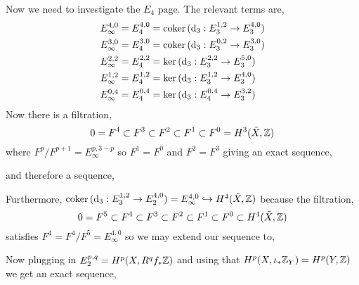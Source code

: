 \documentclass[12pt]{article}
\begin{document}
Now we need to investigate the $E_4$ page. The relevant terms are,
\begin{align*}
E^{4,0}_\infty & = E^{4,0}_4 = \operatorname{\mathrm{coker}}{(\mathrm{d}_3 : E^{1,2}_3 \to E^{4,0}_3)} 
\\
E^{3,0}_\infty & = E^{3,0}_4 = \operatorname{\mathrm{coker}}{(\mathrm{d}_3 : E^{0,2}_3 \to E^{3,0}_3)}
\\
E^{2,2}_{\infty} & = E^{2,2}_4 = \ker{(\mathrm{d}_3 : E^{2,2}_3 \to E^{5, 0}_3)}
\\
E^{1,2}_{\infty} & = E^{1,2}_4 = \ker{(\mathrm{d}_3 : E^{1,2}_3 \to E^{4, 0}_3)}
\\
E^{0,4}_{\infty} & = E^{0,4}_4 = \ker{(\mathrm{d}_3 : E^{0, 4}_4 \to E^{3, 2}_3)}
\end{align*}
Now there is a filtration,
\[ 0 = F^4 \subset F^3 \subset F^2 \subset F^1 \subset F^0 = H^3(\tilde{X}, \mathbb{Z}) \]
where $F^p / F^{p+1} = E^{p,3-p}_\infty$ so $F^1 = F^0$ and $F^2 = F^3$ giving an exact sequence,
\begin{center}
\end{center}
and therefore a sequence,
\begin{center}
\end{center}
Furthermore, $\operatorname{\mathrm{coker}}{(\mathrm{d}_3 : E^{1,2}_3 \to E^{4,0}_2)} = E^{4,0}_{\infty} \hookrightarrow H^4(\tilde{X}, \mathbb{Z})$ because the filtration,
\[ 0 = F^5 \subset F^4 \subset F^3 \subset F^2 \subset F^1 \subset F^0 \subset H^4(\tilde{X}, \mathbb{Z}) \]
satisfies $F^4 = F^4/F^5 = E^{4,0}_\infty$ so we may extend our sequence to,
\begin{center}
\end{center}
Now plugging in $E_2^{p,q} = H^p(X, R^q f_* \mathbb{Z})$ and using that $H^p(X, \iota_* \mathbb{Z}_Y) = H^p(Y, \mathbb{Z})$ we get an exact sequence,
\begin{center}
\end{center}
\end{document}

